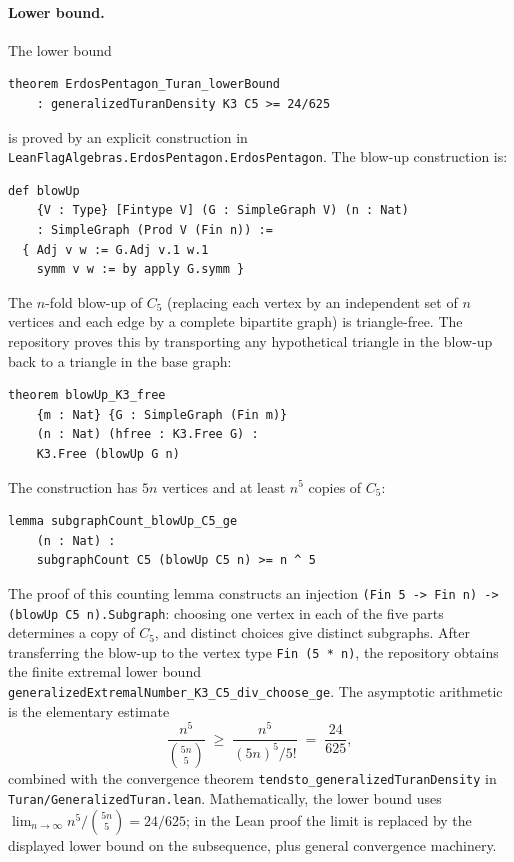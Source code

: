 \documentclass{article}
\newcommand{\lean}[1]{\texttt{#1}}
\begin{document}
\paragraph{Lower bound.}
The lower bound
\begin{lstlisting}
theorem ErdosPentagon_Turan_lowerBound
    : generalizedTuranDensity K3 C5 >= 24/625
\end{lstlisting}
is proved by an explicit construction in
\lean{LeanFlagAlgebras.ErdosPentagon.ErdosPentagon}.  The blow-up
construction is:
\begin{lstlisting}
def blowUp
    {V : Type} [Fintype V] (G : SimpleGraph V) (n : Nat)
    : SimpleGraph (Prod V (Fin n)) :=
  { Adj v w := G.Adj v.1 w.1
    symm v w := by apply G.symm }
\end{lstlisting}
The $n$-fold blow-up of $C_5$ (replacing each vertex by an independent set
of $n$ vertices and each edge by a complete bipartite graph) is
triangle-free.  The repository proves this by transporting any hypothetical
triangle in the blow-up back to a triangle in the base graph:
\begin{lstlisting}
theorem blowUp_K3_free
    {m : Nat} {G : SimpleGraph (Fin m)}
    (n : Nat) (hfree : K3.Free G) :
    K3.Free (blowUp G n)
\end{lstlisting}
The construction has $5n$ vertices and at least $n^5$ copies of $C_5$:
\begin{lstlisting}
lemma subgraphCount_blowUp_C5_ge
    (n : Nat) :
    subgraphCount C5 (blowUp C5 n) >= n ^ 5
\end{lstlisting}
The proof of this counting lemma constructs an injection
\lean{(Fin 5 -> Fin n) -> (blowUp C5 n).Subgraph}: choosing one vertex in
each of the five parts determines a copy of $C_5$, and distinct choices give
distinct subgraphs.  After transferring the blow-up to the vertex type
\lean{Fin (5 * n)}, the repository obtains the finite extremal lower bound
\lean{generalizedExtremalNumber\_K3\_C5\_div\_choose\_ge}.  The asymptotic
arithmetic is the elementary estimate
\[
  \frac{n^5}{\binom{5n}{5}}
  \;\geq\;
  \frac{n^5}{(5n)^5 / 5!}
  \;=\;
  \frac{24}{625},
\]
combined with the convergence theorem \lean{tendsto\_generalizedTuranDensity}
in \lean{Turan/GeneralizedTuran.lean}.  Mathematically, the lower bound uses
$\lim_{n\to\infty} n^5/\binom{5n}{5} = 24/625$; in the Lean proof the limit
is replaced by the displayed lower bound on the subsequence, plus general
convergence machinery.
\end{document}
